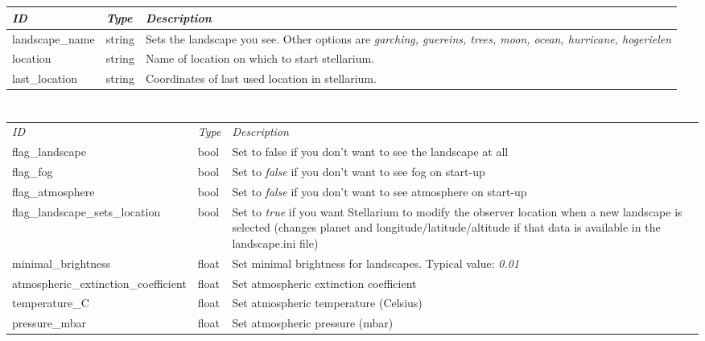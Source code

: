 \section{}\label{section-init-location}

\begin{longtabu} to \textwidth {l|l|X}
\toprule
\emph{ID} & \emph{Type} & \emph{Description}\tabularnewline
\midrule
landscape\_name & string & Sets the landscape you see.
Other options are \emph{garching, guereins, trees, moon, ocean,
hurricane, hogerielen}\tabularnewline
\midrule
location & string & Name of location on which to start
stellarium.\tabularnewline
\midrule
last\_location & string & Coordinates of last used location in
stellarium.\tabularnewline
\bottomrule
\end{longtabu}

\section{}\label{section-landscape}

\begin{longtabu} to \textwidth {l|l|X}
\toprule
\emph{ID} & \emph{Type} & \emph{Description}\tabularnewline
flag\_landscape & bool & Set to false if you don't want to
see the landscape at all\tabularnewline
\midrule
flag\_fog & bool & Set to \emph{false} if you don't want to
see fog on start-up\tabularnewline
\midrule
flag\_atmosphere & bool & Set to \emph{false} if you don't
want to see atmosphere on start-up\tabularnewline
\midrule
flag\_landscape\_sets\_location & bool & Set to \emph{true}
if you want Stellarium to modify the observer location when a new
landscape is selected (changes planet and longitude/latitude/altitude if
that data is available in the landscape.ini file)\tabularnewline
\midrule
minimal\_brightness & float & Set minimal brightness for
landscapes. Typical value: \emph{0.01}\tabularnewline
\midrule
atmospheric\_extinction\_coefficient & float & Set atmospheric
extinction coefficient\tabularnewline
\midrule
temperature\_C & float & Set atmospheric temperature
(Celsius)\tabularnewline
\midrule
pressure\_mbar & float & Set atmospheric pressure
(mbar)\tabularnewline
\bottomrule
\end{longtabu}

\section{}\label{section-localization}

